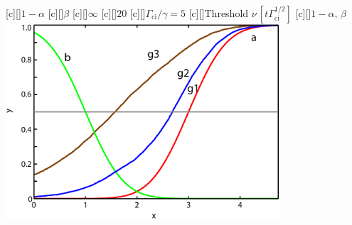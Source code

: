 

    \figstyle
    [c][]{$1-\alpha$}
    [c][]{$\beta$}
    [c][]{$\infty$}
    [c][]{$20$}
    [c][]{$\Gamma_\text{ci}/\gamma=5$}
    [c][]{Threshold $\nu\,[t\Gamma_\text{ci}^{1/2}]$}
    [c][]{$1-\alpha,\,\beta$}
    \includegraphics[width=4in]{ghz5.eps}

